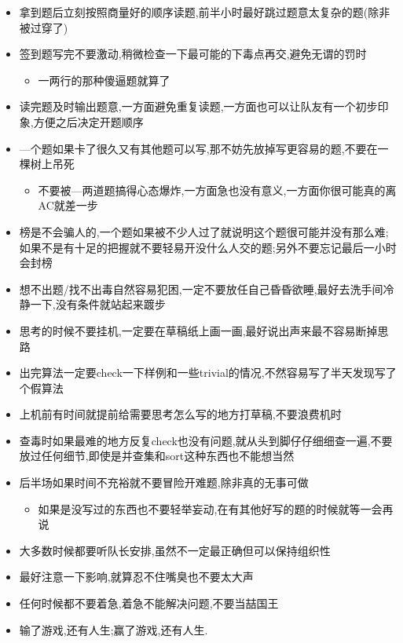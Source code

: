 \noindent
\begin{itemize}
	\item 拿到题后立刻按照商量好的顺序读题,前半小时最好跳过题意太复杂的题(除非被过穿了)
	
	\item 签到题写完不要激动,稍微检查一下最可能的下毒点再交,避免无谓的罚时
		\begin{itemize}
			\item 一两行的那种傻逼题就算了
		\end{itemize}
		
	\item 读完题及时输出题意,一方面避免重复读题,一方面也可以让队友有一个初步印象,方便之后决定开题顺序
	
	\item —个题如果卡了很久又有其他题可以写,那不妨先放掉写更容易的题,不要在一棵树上吊死
		\begin{itemize}
			\item 不要被—两道题搞得心态爆炸,一方面急也没有意义,一方面你很可能真的离AC就差一步
		\end{itemize}
		
	\item 榜是不会骗人的,一个题如果被不少人过了就说明这个题很可能并没有那么难;如果不是有十足的把握就不要轻易开没什么人交的题;另外不要忘记最后一小时会封榜
	
	\item 想不出题/找不出毒自然容易犯困,一定不要放任自己昏昏欲睡,最好去洗手间冷静一下,没有条件就站起来踱步
	
	\item 思考的时候不要挂机,一定要在草稿纸上画一画,最好说出声来最不容易断掉思路
	
	\item 出完算法一定要check一下样例和一些trivial的情况,不然容易写了半天发现写了个假算法
	
	\item 上机前有时间就提前给需要思考怎么写的地方打草稿,不要浪费机时
	
	\item 查毒时如果最难的地方反复check也没有问题,就从头到脚仔仔细细查一遍,不要放过任何细节,即使是并查集和sort这种东西也不能想当然
	
	\item 后半场如果时间不充裕就不要冒险开难题,除非真的无事可做
		\begin{itemize}
			\item 如果是没写过的东西也不要轻举妄动,在有其他好写的题的时候就等一会再说
		\end{itemize}
		
	\item 大多数时候都要听队长安排,虽然不一定最正确但可以保持组织性
	
	\item 最好注意一下影响,就算忍不住嘴臭也不要太大声
	
	\item 任何时候都不要着急,着急不能解决问题,不要当喆国王
	
	\item 输了游戏,还有人生;赢了游戏,还有人生.
\end{itemize}